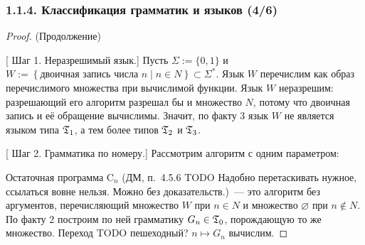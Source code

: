 \documentclass[mathserif,12pt,aspectratio=169]{beamer}
\let\emptyset\varnothing
\def\Set#1#2{\left\{ #1 \mid #2 \right\}}
\def\Assign{\operatorname{:=}}
\def\proofsection#1{\par{\color{brown}\sffamily\small  [\;}{\sffamily\small\color{brown} #1}{\sffamily\small\color{brown}\;]}\;}
\def\TODO#1{{\color{gray} TODO {#1}}}
\begin{document}
\begin{frame}
\frametitle{1.1.4. Классификация грамматик и языков (4/6)}

\begin{proof} (Продолжение)
\proofsection{ Шаг 1. Неразрешимый язык.} Пусть $\Sigma\Assign\{0,1\}$ и
$W\Assign\Set{\text{двоичная запись числа } n}{n\in N}\subset\Sigma^*.$
Язык $W$ перечислим как образ перечислимого множества при вычислимой функции.
Язык $W$ неразрешим: разрешающий его алгоритм разрешал бы и множество $N$,
потому что двоичная запись и её обращение вычислимы. Значит, по факту 3 язык $W$
не является языком типа $\frak{T}_1$, а тем более типов $\frak{T}_2$ и $\frak{T}_3$.

\proofsection{ Шаг 2. Грамматика по номеру.} Рассмотрим алгоритм с одним параметром:
\vspace{-4pt}
\begin{algorithmic}
\STATE {$\;\; x\Assign d_1(n)$}
\end{algorithmic}
\vspace{-4pt}

Остаточная программа $\mathrm{C}_n$ (ДМ, п.~4.5.6 \TODO{Надобно перетаскивать нужное, ссылаться вовне нельзя. Можно без доказательств.})~--- это алгоритм без
аргументов, перечисляющий множество $W$ при $n\in N$ и множество $\emptyset$
при $n\not\in N$. По факту 2 построим по ней грамматику $G_n\in\frak{T}_0$,
порождающую то же множество. Переход \TODO{пешеходный?} $n\mapsto G_n$ вычислим.
\end{proof}
\end{frame}
\end{document}
